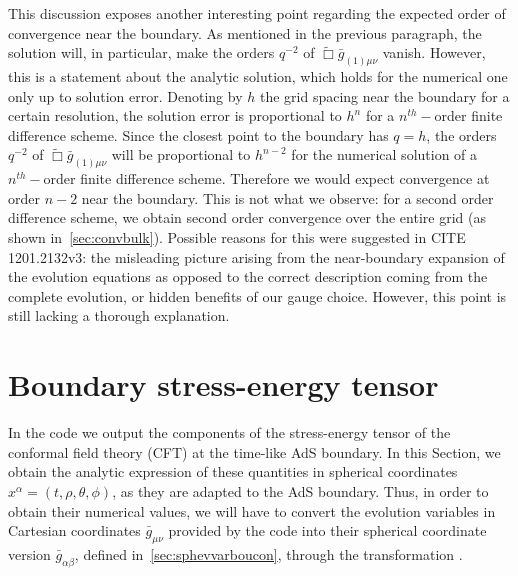 \documentclass[12pt]{iopart} %
\begin{document}
This discussion exposes another interesting point regarding the expected order of convergence near the boundary. As mentioned in the previous paragraph, the solution will, in particular, make the orders $q^{-2}$ of $\tilde{\Box}\bar{g}_{(1)\mu\nu}$ vanish. However, this is a statement about the analytic solution, which holds for the numerical one only up to solution error. Denoting by $h$ the grid spacing near the boundary for a certain resolution, the solution error is proportional to $h^n$ for a $n^{th}-$order finite difference scheme. Since the closest point to the boundary has $q=h$, the orders $q^{-2}$ of $\tilde{\Box}\bar{g}_{(1)\mu\nu}$ will be proportional to $h^{n-2}$ for the numerical solution of a $n^{th}-$order finite difference scheme. Therefore we would expect convergence at order $n-2$ near the boundary. This is not what we observe: for a second order difference scheme, we obtain second order convergence over the entire grid (as shown in~\ref{sec:convbulk}). Possible reasons for this were suggested in CITE 1201.2132v3: the misleading picture arising from the near-boundary expansion of the evolution equations as opposed to the correct description coming from the complete evolution, or hidden benefits of our gauge choice. However, this point is still lacking a thorough explanation.

\section{Boundary stress-energy tensor}
\label{sec:bouset2}

In the code we output the components of the stress-energy tensor of the conformal field theory (CFT) at the time-like AdS boundary. In this Section, we obtain the analytic expression of these quantities in spherical coordinates $x^\alpha=(t,\rho,\theta,\phi)$, as they are adapted to the AdS boundary. Thus, in order to obtain their numerical values, we will have to convert the evolution variables in Cartesian coordinates $\bar{g}_{\mu\nu}$ provided by the code into their spherical coordinate version $\bar{g}_{\alpha\beta}$, defined in~\ref{sec:sphevvarboucon}, through the transformation .
\end{document}

